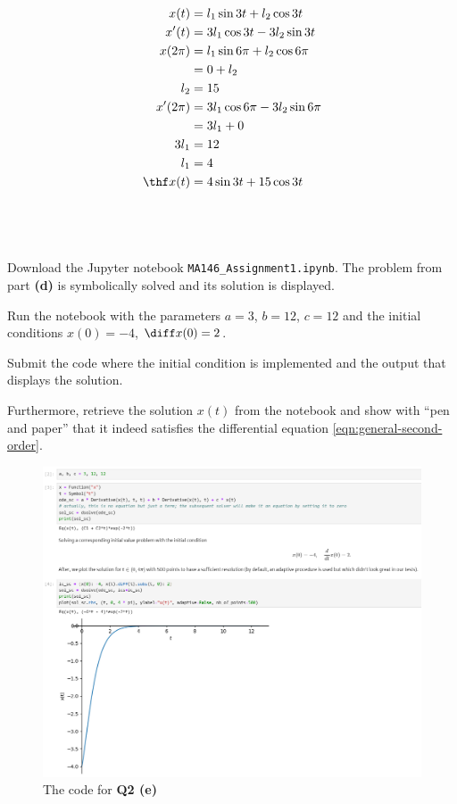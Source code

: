\documentclass[a4paper]{article}
\begin{document}
\begin{align*}
x(t) &= l_1 \sin 3t + l_2 \cos 3t \\
x'(t) &= 3 l_1 \cos 3t - 3 l_2 \sin 3t \\
x(2\pi) &= l_1 \sin 6\pi + l_2 \cos 6\pi \\
&= 0 + l_2 \\
l_2 &= 15 \\
x'(2\pi) &= 3 l_1 \cos 6\pi - 3 l_2 \sin 6\pi \\
&= 3 l_1 + 0 \\
3 l_1 &= 12 \\
l_1 &= 4 \\
\thf x(t) &= 4 \sin 3t + 15 \cos 3t
\end{align*}

\subsection{~} %

\begin{questionbody}
Download the Jupyter notebook \texttt{MA146\_Assignment1.ipynb}. The problem from part \textbf{(d)} is symbolically solved and its solution is displayed.

Run the notebook with the parameters $a = 3$, $b = 12$, $c = 12$ and the initial conditions $x(0) = -4$, $\diff x(0) = 2$.

Submit the code where the initial condition is implemented and the output that displays the solution.

Furthermore, retrieve the solution $x(t)$ from the notebook and show with \enquote{pen and paper} that it indeed satisfies the differential equation \eqref{eqn:general-second-order}.
\end{questionbody}

\begin{figure}[hbtp]
	\centering
	\includegraphics[width=\linewidth]{Q2-e}
	\caption{The code for \textbf{Q2 (e)}}
\end{figure}
\end{document}
